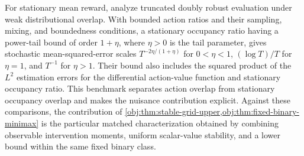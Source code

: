 For stationary mean reward, \citet[Section 3.2, Assumptions 7--8, and Theorem 3.9]{Mehrabi2024} analyze truncated doubly robust evaluation under weak distributional overlap. With bounded action ratios and their sampling, mixing, and boundedness conditions, a stationary occupancy ratio having a power-tail bound of order \(1+\eta\), where \(\eta>0\) is the tail parameter, gives stochastic mean-squared-error scales \(T^{-2\eta/(1+\eta)}\) for \(0<\eta<1\), \((\log T)/T\) for \(\eta=1\), and \(T^{-1}\) for \(\eta>1\). Their bound also includes the squared product of the \(L^2\) estimation errors for the differential action-value function and stationary occupancy ratio. This benchmark separates action overlap from stationary occupancy overlap and makes the nuisance contribution explicit. Against these comparisons, the contribution of \cref{obj:thm:stable-grid-upper,obj:thm:fixed-binary-minimax} is the particular matched characterization obtained by combining observable intervention moments, uniform scalar-value stability, and a lower bound within the same fixed binary class.
